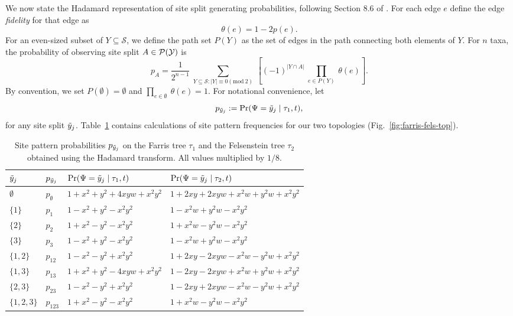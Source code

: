 We now state the Hadamard representation of site split generating probabilities, following Section 8.6 of \cite{Semple2003-em}.
For each edge $e$ define the edge \emph{fidelity} for that edge as
$$
\theta(e) = 1-2p(e).
$$
For an even-sized subset of $Y\subseteq\mathcal{S}$, we define the path set $P(Y)$ as the set of edges in the path connecting both elements of $Y$.
For $n$ taxa, the probability of observing site split $A\in\mathcal{P}(\mathcal{Y})$ is
\begin{equation}
\label{eq:hadamard_probability}
p_A = \frac{1}{2^{n-1}} \ \sum_{Y \subseteq \mathcal{S} : |Y| \equiv 0 (\mathrm{mod} \ 2)} \ \left[(-1)^{|Y \cap A|} \ \prod_{e\in P(Y)} \ \theta(e) \right].
\end{equation}
By convention, we set $P(\emptyset)=\emptyset$ and $\prod_{e\in\emptyset} \ \theta(e) = 1$.
For notational convenience, let
$$
p_{\tilde{y}_j} := \Pr(\Psi=\tilde{y}_j \mid \tau_1,t),
$$
for any site split $\tilde{y}_j$.
Table~\ref{tab:sitepatprob} contains calculations of site pattern frequencies for our two topologies (Fig.~\ref{fig:farris-fels-top}).

\begin{table}[ht]
\centering
\begin{tabular}{|l|l|l|l|}
    \hline
$\tilde{y}_j$  & $p_{\tilde{y}_j}$ &$\Pr(\Psi=\tilde{y}_j \mid \tau_1,t)$&$\Pr(\Psi=\tilde{y}_j \mid \tau_2,t)$\\
    \hline
    $\emptyset$ & $p_{\emptyset}$   &$1+x^2+y^2+4xyw+x^2y^2$&$1+2xy+2xyw+x^2w+y^2w+x^2y^2$\\
    $\{1\}$     & $p_{1}$   &$1-x^2+y^2-x^2y^2$&$1-x^2w+y^2w-x^2y^2$\\
    $\{2\}$     & $p_{2}$   &$1+x^2-y^2-x^2y^2$&$1+x^2w-y^2w-x^2y^2$\\
    $\{3\}$     & $p_{3}$   &$1-x^2+y^2-x^2y^2$&$1-x^2w+y^2w-x^2y^2$\\
    $\{1,2\}$   & $p_{12}$   &$1-x^2-y^2+x^2y^2$&$1+2xy-2xyw-x^2w-y^2w+x^2y^2$\\
    $\{1,3\}$   & $p_{13}$   &$1+x^2+y^2-4xyw+x^2y^2$&$1-2xy-2xyw+x^2w+y^2w+x^2y^2$\\
    $\{2,3\}$   & $p_{23}$   &$1-x^2-y^2+x^2y^2$&$1-2xy+2xyw-x^2w-y^2w+x^2y^2$\\
    $\{1,2,3\}$ & $p_{123}$   &$1+x^2-y^2-x^2y^2$&$1+x^2w-y^2w-x^2y^2$\\
    \hline
\end{tabular}
\caption{Site pattern probabilities $p_{\tilde{y}_j}$ on the Farris tree $\tau_1$ and the Felsenstein tree $\tau_2$ obtained using the Hadamard transform.
All values multiplied by $1/8$.}
\label{tab:sitepatprob}
\end{table}


